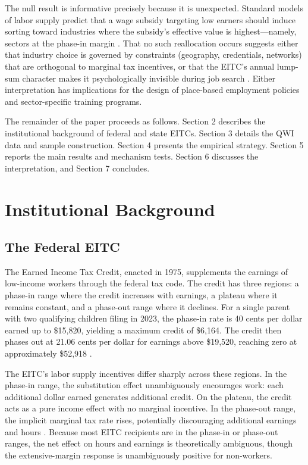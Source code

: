 \documentclass[12pt]{article}
\begin{document}
The null result is informative precisely because it is unexpected. Standard models of labor supply predict that a wage subsidy targeting low earners should induce sorting toward industries where the subsidy's effective value is highest---namely, sectors at the phase-in margin \citep{saez2010, chetty2013}. That no such reallocation occurs suggests either that industry choice is governed by constraints (geography, credentials, networks) that are orthogonal to marginal tax incentives, or that the EITC's annual lump-sum character makes it psychologically invisible during job search \citep{romich2006, sykes2015}. Either interpretation has implications for the design of place-based employment policies and sector-specific training programs.

The remainder of the paper proceeds as follows. Section 2 describes the institutional background of federal and state EITCs. Section 3 details the QWI data and sample construction. Section 4 presents the empirical strategy. Section 5 reports the main results and mechanism tests. Section 6 discusses the interpretation, and Section 7 concludes.


\section{Institutional Background}

\subsection{The Federal EITC}

The Earned Income Tax Credit, enacted in 1975, supplements the earnings of low-income workers through the federal tax code. The credit has three regions: a phase-in range where the credit increases with earnings, a plateau where it remains constant, and a phase-out range where it declines. For a single parent with two qualifying children filing in 2023, the phase-in rate is 40 cents per dollar earned up to \$15,820, yielding a maximum credit of \$6,164. The credit then phases out at 21.06 cents per dollar for earnings above \$19,520, reaching zero at approximately \$52,918 \citep{irs2023}.

The EITC's labor supply incentives differ sharply across these regions. In the phase-in range, the substitution effect unambiguously encourages work: each additional dollar earned generates additional credit. On the plateau, the credit acts as a pure income effect with no marginal incentive. In the phase-out range, the implicit marginal tax rate rises, potentially discouraging additional earnings and hours \citep{eissa1996, saez2010}. Because most EITC recipients are in the phase-in or phase-out ranges, the net effect on hours and earnings is theoretically ambiguous, though the extensive-margin response is unambiguously positive for non-workers.
\end{document}
